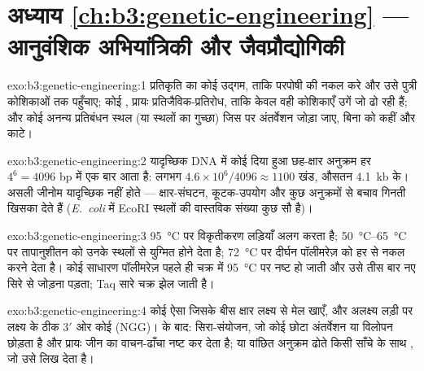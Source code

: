 \section*{अध्याय \ref{ch:b3:genetic-engineering} --- आनुवंशिक अभियांत्रिकी और जैवप्रौद्योगिकी}

\begin{solution}{exo:b3:genetic-engineering:1}
प्रतिकृति का कोई उद्गम, ताकि परपोषी  की नकल करे और उसे पुत्री
कोशिकाओं तक पहुँचाए; कोई , प्रायः प्रतिजैविक-प्रतिरोध,
ताकि केवल वही कोशिकाएँ उगें जो  ढो रही हैं; और कोई अनन्य
प्रतिबंधन स्थल (या स्थलों का गुच्छा) जिस पर अंतर्वेशन जोड़ा जाए, बिना
 को कहीं और काटे।
\end{solution}

\begin{solution}{exo:b3:genetic-engineering:2}
यादृच्छिक DNA में कोई दिया हुआ छह-क्षार अनुक्रम हर $4^{6} = 4096$ bp में
एक बार आता है: लगभग $4.6\times 10^{6}/4096 \approx 1100$ खंड, औसतन
\qty{4.1}{kb} के। असली जीनोम यादृच्छिक नहीं होते --- क्षार-संघटन,
कूटक-उपयोग और कुछ अनुक्रमों से बचाव गिनती खिसका देते हैं
(\emph{E.~coli} में EcoRI स्थलों की वास्तविक संख्या कुछ सौ है)।
\end{solution}

\begin{solution}{exo:b3:genetic-engineering:3}
\qty{95}{\celsius} पर विकृतीकरण लड़ियाँ अलग करता है;
\qtyrange{50}{65}{\celsius} पर तापानुशीतन  को उनके स्थलों से
युग्मित होने देता है; \qty{72}{\celsius} पर दीर्घन पॉलीमरेज़ को हर
 से नकल करने देता है। कोई साधारण पॉलीमरेज़ पहले ही चक्र में
\qty{95}{\celsius} पर नष्ट हो जाती और उसे तीस बार नए सिरे से जोड़ना
पड़ता; Taq सारे चक्र झेल जाती है।
\end{solution}

\begin{solution}{exo:b3:genetic-engineering:4}
कोई ऐसा  जिसके बीस क्षार लक्ष्य से मेल खाएँ, और
अलक्ष्य लड़ी पर लक्ष्य के ठीक 3$'$ ओर कोई  (NGG)।  के
बाद: सिरा-संयोजन, जो कोई छोटा अंतर्वेशन या विलोपन छोड़ता है और प्रायः
जीन का वाचन-ढाँचा नष्ट कर देता है; या वांछित अनुक्रम ढोते किसी साँचे
के साथ , जो उसे लिख देता है।
\end{solution}

